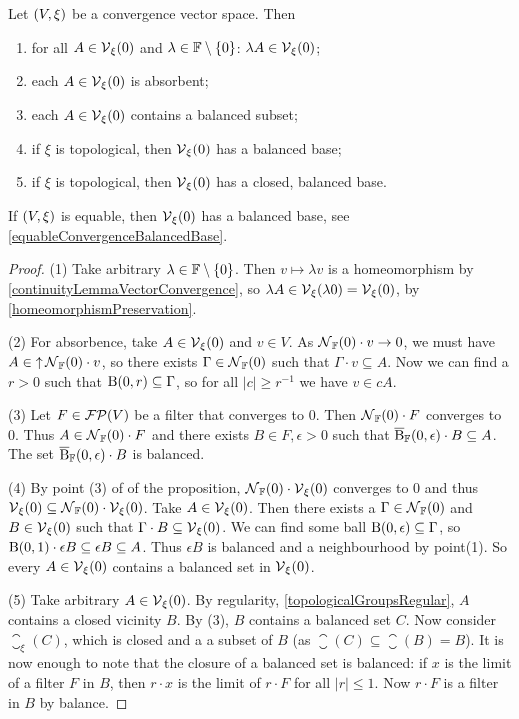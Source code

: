 \begin{corollary} \label{vicinityFilterAtOrigin}
Let $\sSet{V, \xi}$ be a convergence vector space. Then
\begin{enumerate}
\item for all $A\in \operatorname{\mathcal{V}}_\xi(0)$ and $\lambda\in \mathbb{F}\setminus\{0\}$: $\lambda A\in \operatorname{\mathcal{V}}_\xi(0)$;
\item each $A \in \operatorname{\mathcal{V}}_\xi(0)$ is absorbent;
\item each $A \in \operatorname{\mathcal{V}}_\xi(0)$ contains a balanced subset;
\item if $\xi$ is topological, then $\operatorname{\mathcal{V}}_\xi(0)$ has a balanced base;
\item if $\xi$ is topological, then $\operatorname{\mathcal{V}}_\xi(0)$ has a closed, balanced base.
\end{enumerate}
\end{corollary}
If $\sSet{V,\xi}$ is equable, then $\operatorname{\mathcal{V}}_\xi(0)$ has a balanced base, see \ref{equableConvergenceBalancedBase}.
\begin{proof}
(1) Take arbitrary $\lambda\in\mathbb{F}\setminus\{0\}$. Then $v\mapsto \lambda v$ is a homeomorphism by \ref{continuityLemmaVectorConvergence}, so $\lambda A \in \operatorname{\mathcal{V}}_\xi(\lambda 0) = \operatorname{\mathcal{V}}_\xi(0)$, by \ref{homeomorphismPreservation}.

(2) For absorbence, take $A\in \operatorname{\mathcal{V}}_\xi(0)$ and $v\in V$. As $\operatorname{\mathcal{N}}_{\mathbb{F}}(0)\cdot v \to 0$, we must have $A\in \operatorname{\uparrow}\operatorname{\mathcal{N}}_{\mathbb{F}}(0)\cdot v$, so there exists $\Gamma \in \operatorname{\mathcal{N}}_{\mathbb{F}}(0)$ such that $\Gamma\cdot v \subseteq A$. Now we can find a $r>0$ such that $\operatorname{B}(0,r)\subseteq \Gamma$, so for all $|c|\geq r^{-1}$ we have $v\in cA$.

(3) Let $F\in \operatorname{\mathcal{FP}}(V)$ be a filter that converges to $0$. Then $\operatorname{\mathcal{N}}_{\mathbb{F}}(0)\cdot F$ converges to $0$. Thus $A\in \operatorname{\mathcal{N}}_{\mathbb{F}}(0)\cdot F$ and there exists $B\in F, \epsilon > 0$ such that $\operatorname{\overline{B}}_{\mathbb{F}}(0,\epsilon)\cdot B \subseteq A$. The set $\operatorname{\overline{B}}_{\mathbb{F}}(0,\epsilon)\cdot B$ is balanced.

(4) By point (3) of of the proposition, $\operatorname{\mathcal{N}}_{\mathbb{F}}(0)\cdot \operatorname{\mathcal{V}}_\xi(0)$ converges to $0$ and thus $\operatorname{\mathcal{V}}_\xi(0) \subseteq \operatorname{\mathcal{N}}_{\mathbb{F}}(0)\cdot\operatorname{\mathcal{V}}_\xi(0)$. Take $A\in \operatorname{\mathcal{V}}_\xi(0)$. Then there exists a $\Gamma\in\operatorname{\mathcal{N}}_{\mathbb{F}}(0)$ and $B\in \operatorname{\mathcal{V}}_\xi(0)$ such that $\Gamma\cdot B \subseteq \operatorname{\mathcal{V}}_\xi(0)$. We can find some ball $\operatorname{B}(0,\epsilon) \subseteq \Gamma$, so $\operatorname{B}(0,1)\cdot \epsilon B\subseteq \epsilon B \subseteq A$. Thus $\epsilon B$ is balanced and a neighbourhood by point(1). So every $A\in \operatorname{\mathcal{V}}_\xi(0)$ contains a balanced set in $\operatorname{\mathcal{V}}_\xi(0)$.

(5) Take arbitrary $A\in \operatorname{\mathcal{V}}_\xi(0)$. By regularity, \ref{topologicalGroupsRegular}, $A$ contains a closed vicinity $B$. By (3), $B$ contains a balanced set $C$. Now consider $\closure_\xi(C)$, which is closed and a a subset of $B$ (as $\closure(C)\subseteq \closure(B) = B$). It is now enough to note that the closure of a balanced set is balanced: if $x$ is the limit of a filter $F$ in $B$, then $r\cdot x$ is the limit of $r\cdot F$ for all $|r|\leq 1$. Now $r\cdot F$ is a filter in $B$ by balance.
\end{proof}

